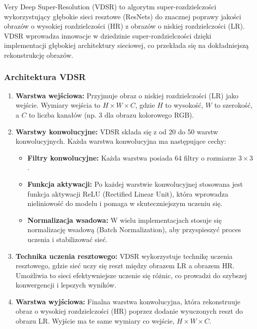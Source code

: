 \documentclass[10pt]{article}
\begin{document}
Very Deep Super-Resolution (VDSR) to algorytm super-rozdzielczości wykorzystujący głębokie sieci resztowe (ResNets) do znacznej poprawy jakości obrazów o wysokiej rozdzielczości (HR) z obrazów o niskiej rozdzielczości (LR). VDSR wprowadza innowacje w dziedzinie super-rozdzielczości dzięki implementacji głębokiej architektury sieciowej, co przekłada się na dokładniejszą rekonstrukcję obrazów.

\subsubsection*{Architektura VDSR}

\begin{enumerate}
    \item \textbf{Warstwa wejściowa:} Przyjmuje obraz o niskiej rozdzielczości (LR) jako wejście. Wymiary wejścia to \( H \times W \times C \), gdzie \( H \) to wysokość, \( W \) to szerokość, a \( C \) to liczba kanałów (np. 3 dla obrazu kolorowego RGB).

    \item \textbf{Warstwy konwolucyjne:} VDSR składa się z od 20 do 50 warstw konwolucyjnych. Każda warstwa konwolucyjna ma następujące cechy:
    \begin{itemize}
        \item \textbf{Filtry konwolucyjne:} Każda warstwa posiada 64 filtry o rozmiarze \( 3 \times 3 \).
        \item \textbf{Funkcja aktywacji:} Po każdej warstwie konwolucyjnej stosowana jest funkcja aktywacji ReLU (Rectified Linear Unit), która wprowadza nieliniowość do modelu i pomaga w skuteczniejszym uczeniu się.
        \item \textbf{Normalizacja wsadowa:} W wielu implementacjach stosuje się normalizację wsadową (Batch Normalization), aby przyspieszyć proces uczenia i stabilizować sieć.
    \end{itemize}

    \item \textbf{Technika uczenia resztowego:} VDSR wykorzystuje technikę uczenia resztowego, gdzie sieć uczy się reszt między obrazem LR a obrazem HR. Umożliwia to sieci efektywniejsze uczenie się różnic, co prowadzi do szybszej konwergencji i lepszych wyników.
    
    \item \textbf{Warstwa wyjściowa:} Finalna warstwa konwolucyjna, która rekonstruuje obraz o wysokiej rozdzielczości (HR) poprzez dodanie wyuczonych reszt do obrazu LR. Wyjście ma te same wymiary co wejście, \( H \times W \times C \).
\end{enumerate}
\end{document}
